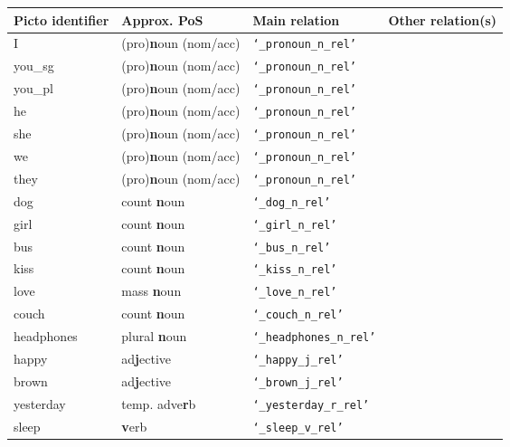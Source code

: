 \begin{figure}[h!]
\centering
\small
\begin{tabular}{ | p{3.5cm} | p{3.5cm} | p{3.5cm} | p{3.5cm} | }
    \hline
    \textbf{Picto identifier} & \textbf{Approx. PoS} & \textbf{Main relation} & \textbf{Other relation(s)} \\
    \hline
    I          & (pro)\textbf{n}oun (nom/acc) &   \texttt{`\_pronoun\_n\_rel'}       &        \\
    you\_sg        & (pro)\textbf{n}oun (nom/acc) &    \texttt{`\_pronoun\_n\_rel'}      &        \\
    you\_pl        & (pro)\textbf{n}oun (nom/acc)  &   \texttt{`\_pronoun\_n\_rel'}       &        \\
    he         & (pro)\textbf{n}oun (nom/acc) & \texttt{`\_pronoun\_n\_rel'}         &        \\
    she        & (pro)\textbf{n}oun (nom/acc)  & \texttt{`\_pronoun\_n\_rel'}         &        \\
    we         & (pro)\textbf{n}oun (nom/acc) & \texttt{`\_pronoun\_n\_rel'}         &        \\
    they       & (pro)\textbf{n}oun (nom/acc)  & \texttt{`\_pronoun\_n\_rel'}         &        \\
    dog        & count \textbf{n}oun & \texttt{`\_dog\_n\_rel'}         &        \\
    girl       & count \textbf{n}oun & \texttt{`\_girl\_n\_rel'}         &        \\
    bus        & count \textbf{n}oun & \texttt{`\_bus\_n\_rel'}         &        \\
    kiss       & count \textbf{n}oun & \texttt{`\_kiss\_n\_rel'}         &        \\
    love       & mass \textbf{n}oun & \texttt{`\_love\_n\_rel'}         &        \\
    couch      & count \textbf{n}oun & \texttt{`\_couch\_n\_rel'}         &        \\
    headphones & plural \textbf{n}oun & \texttt{`\_headphones\_n\_rel'}         &        \\
    happy      & ad\textbf{j}ective     & \texttt{`\_happy\_j\_rel'}         &        \\
    brown      & ad\textbf{j}ective     & \texttt{`\_brown\_j\_rel'}         &        \\
    yesterday  & temp. adve\textbf{r}b     & \texttt{`\_yesterday\_r\_rel'}         &        \\
    sleep      & \textbf{v}erb     & \texttt{`\_sleep\_v\_rel'}         &        \\

\end{tabular}
\end{figure}

